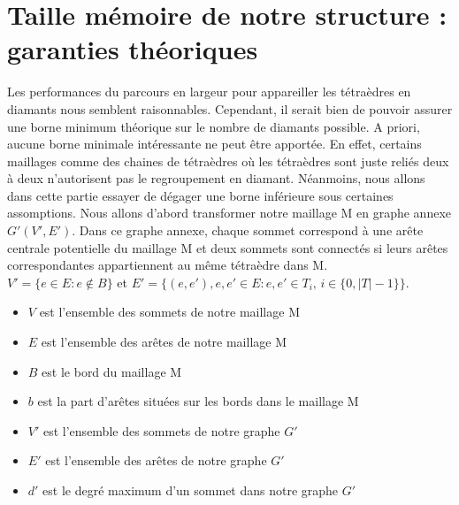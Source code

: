 \section{Taille mémoire de notre structure : garanties théoriques}
\noindent
Les performances du parcours en largeur pour appareiller les tétraèdres en diamants nous semblent raisonnables. Cependant, il serait bien de pouvoir assurer une borne minimum théorique sur le nombre de diamants possible. A priori, aucune borne minimale intéressante ne peut être apportée. En effet, certains maillages comme des chaines de tétraèdres où les tétraèdres sont juste reliés deux à deux n'autorisent pas le regroupement en diamant. Néanmoins, nous allons dans cette partie essayer de dégager une borne inférieure sous certaines assomptions. Nous allons d'abord transformer notre maillage M en graphe annexe $G'(V',E')$. Dans ce graphe annexe, chaque sommet correspond à une arête centrale potentielle du maillage M et deux sommets sont connectés si leurs arêtes correspondantes appartiennent au même tétraèdre dans M.\\
$V' = \{e\in E : e\notin B\}$ et $E'=\{(e,e'), e,e'\in E : e,e' \in T_i, \,  i\in \{0,|T|-1\}\}$.
\begin{itemize}
\item $V$ est l'ensemble des sommets de notre maillage M
\item $E$ est l'ensemble des arêtes de notre maillage M
\item $B$ est le bord du maillage M
\item $b$ est la part d'arêtes situées sur les bords dans le maillage M
\item $V'$ est l'ensemble des sommets de notre graphe $G'$
\item $E'$ est l'ensemble des arêtes de notre graphe $G'$
\item $d'$ est le degré maximum d'un sommet dans notre graphe $G'$
\end{itemize}

